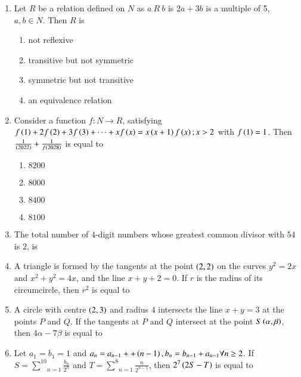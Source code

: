 \documentclass[journal]{IEEEtran}
\begin{document}
\begin{enumerate}
    \item Let $R$ be a relation defined on $N$ as $a\ R\ b$ is $2a+3b$ is a multiple of 5, $a,b\in N$. Then $R$ is

		\begin{multicols}{2}
			\begin{enumerate}
				\item not reflexive
				\item transitive but not symmetric
				\item symmetric but not transitive
				\item an equivalence relation
			\end{enumerate}
		\end{multicols}

    \item Consider a function $f:N\to R$, satisfying $f\left(1\right)+2f\left(2\right)+3f\left(3\right)+\cdots+xf\left(x\right)=x\left(x+1\right)f\left(x\right);x>2$ with $f\left(1\right)=1$. Then $\frac{1}{\left(2022\right)}+\frac{1}{f\left(2028\right)}$ is equal to 

		\begin{multicols}{4}
			\begin{enumerate}
				\item $8200$
				\item $8000$
				\item $8400$
				\item $8100$
			\end{enumerate}
		\end{multicols}
  
    \item The total number of $4$-digit numbers whose greatest common divisor with $54$ is $2$, is

    \item A triangle is formed by the tangents at the point $\left(2,2\right)$ on the curves $y^2=2x$ and $x^2+y^2=4x$, and the line $x+y+2=0$. If $r$ is the radius of its circumcircle, then $r^2$ is equal to
		
    \item A circle with centre $\left(2,3\right)$ and radius $4$ intersects the line $x+y=3$ at the points $P$ and $Q$. If the tangents at $P$ and $Q$ intersect at the point $S\left(\alpha,\beta\right)$, then $4\alpha-7\beta$ is equal to

    \item Let $a_1=b_1=1$ and $a_n=a_{n-1}++\left(n-1\right),b_n=b_{n-1}+a_{n-1}\forall n\geq2$. If $S=\underset{n=1}{\overset{10}{\sum}}\frac{b_n}{2^n}$ and $T=\underset{n=1}{\overset{8}{\sum}}\frac{n}{2^{n-1}}$, then $2^7\left(2S-T\right)$ is equal to


\end{enumerate}
\end{document}
